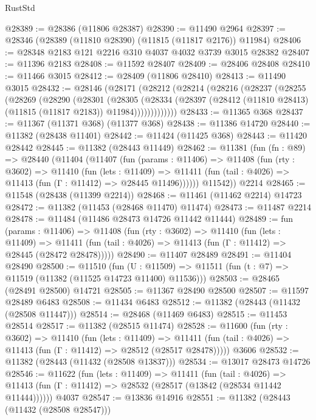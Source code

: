 \begin{lexlean}{RustStd}
\begin{coremodule}
@28389 := @28386 (@11806 @28387)
@28390 := @11490 @2964
@28397 := @28346 (@28389 (@11810 @28390) (@11815 (@11817 @2176)) @11984)
@28406 := @28348 @2183 @121 @2216 @310 @4037 @4032 @3739 @3015 @28382
@28407 := @11396 @2183
@28408 := @11592 @28407
@28409 := @28406 @28408
@28410 := @11466 @3015
@28412 := @28409 (@11806 @28410)
@28413 := @11490 @3015
@28432 := @28146
    (@28171
      (@28212
        (@28214
          (@28216
            (@28237
              (@28255
                (@28269
                  (@28290
                    (@28301
                      (@28305
                        (@28334
                          (@28397
                            (@28412 (@11810 @28413) (@11815 (@11817 @2183)) @11984)))))))))))))
@28433 := @11365 @368
@28437 := @11367 (@11371 @368) (@11377 @368)
@28438 := @11386 @14720
@28440 := @11382 (@28438 @11401)
@28442 := @11424 (@11425 @368)
@28443 := @11420 @28442
@28445 := @11382 (@28443 @11449)
@28462 := @11381
    (fun (fn : @89) =>
    @28440
      (@11404
        (@11407
          (fun (params : @11406) =>
          @11408
            (fun (rty : @3602) =>
            @11410
              (fun (lets : @11409) =>
              @11411 (fun (tail : @4026) => @11413 (fun (Γ : @11412) => @28445 @11496))))))
        @11542))
    @2214
@28465 := @11548 (@28438 (@11399 @2214))
@28468 := @11461 (@11462 @2214) @14723
@28472 := @11382 (@11453 (@28468 @11470) @11474)
@28473 := @11487 @2214
@28478 := @11484 (@11486 @28473 @14726 @11442 @11444)
@28489 := fun (params : @11406) =>
  @11408
    (fun (rty : @3602) =>
    @11410
      (fun (lets : @11409) =>
      @11411 (fun (tail : @4026) => @11413 (fun (Γ : @11412) => @28445 (@28472 @28478)))))
@28490 := @11407 @28489
@28491 := @11404 @28490
@28500 := @11510
    (fun (U : @11509) => @11511 (fun (t : @7) => @11519 (@11382 (@11525 @14723 @11400) @11536)))
@28503 := @28465 (@28491 @28500) @14721
@28505 := @11367 @28490 @28500
@28507 := @11597 @28489 @6483
@28508 := @11434 @6483
@28512 := @11382 (@28443 (@11432 (@28508 @11447)))
@28514 := @28468 (@11469 @6483)
@28515 := @11453 @28514
@28517 := @11382 (@28515 @11474)
@28528 := @11600
    (fun (rty : @3602) =>
    @11410
      (fun (lets : @11409) =>
      @11411 (fun (tail : @4026) => @11413 (fun (Γ : @11412) => @28512 (@28517 @28478)))))
    @3606
@28532 := @11382 (@28443 (@11432 (@28508 @13837)))
@28534 := @13017 @28473 @14726
@28546 := @11622
    (fun (lets : @11409) =>
    @11411
      (fun (tail : @4026) =>
      @11413 (fun (Γ : @11412) => @28532 (@28517 (@13842 (@28534 @11442 @11444))))))
    @4037
@28547 := @13836 @14916
@28551 := @11382 (@28443 (@11432 (@28508 @28547)))

\end{coremodule}
\end{lexlean}
